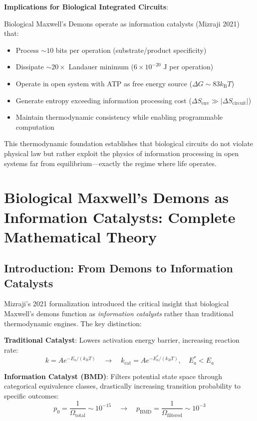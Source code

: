 \documentclass[11pt,a4paper]{article}
\newcommand{\kB}{k_\text{B}}
\begin{document}
\textbf{Implications for Biological Integrated Circuits}:

Biological Maxwell's Demons operate as information catalysts (Mizraji 2021\cite{mizraji2021biological}) that:
\begin{itemize}
\item Process $\sim 10$ bits per operation (substrate/product specificity)
\item Dissipate $\sim 20 \times$ Landauer minimum ($6 \times 10^{-20}$ J per operation)
\item Operate in open system with ATP as free energy source ($\Delta G \sim 83 \kB T$)
\item Generate entropy exceeding information processing cost ($\Delta S_{\text{env}} \gg |\Delta S_{\text{circuit}}|$)
\item Maintain thermodynamic consistency while enabling programmable computation
\end{itemize}

This thermodynamic foundation establishes that biological circuits do not violate physical law but rather exploit the physics of information processing in open systems far from equilibrium—exactly the regime where life operates.

\clearpage

\section{Biological Maxwell's Demons as Information Catalysts: Complete Mathematical Theory}

\subsection{Introduction: From Demons to Information Catalysts}

Mizraji's 2021 formalization introduced the critical insight that biological Maxwell's demons function as \textit{information catalysts} rather than traditional thermodynamic engines\cite{mizraji2021biological}. The key distinction:

\textbf{Traditional Catalyst}: Lowers activation energy barrier, increasing reaction rate:
\begin{equation}
k = A e^{-E_a/(k_B T)} \quad \to \quad k_{\text{cat}} = A e^{-E_a^*/(k_B T)}, \quad E_a^* < E_a
\end{equation}

\textbf{Information Catalyst (BMD)}: Filters potential state space through categorical equivalence classes, drastically increasing transition probability to specific outcomes:
\begin{equation}
p_0 = \frac{1}{\Omega_{\text{total}}} \sim 10^{-15} \quad \to \quad p_{\text{BMD}} = \frac{1}{\Omega_{\text{filtered}}} \sim 10^{-3}
\end{equation}
\end{document}
